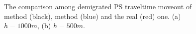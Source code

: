 \begin{figure}
   \centering
   \caption{The comparison among demigrated PS traveltime moveout of method \uppercase\expandafter{} (black), method 
   \uppercase\expandafter{} (blue) and the real (red) one.
   (a) $h=1000m$, (b) $h=500m$.}
   \label{fig:Sens_vp}
\end{figure}



